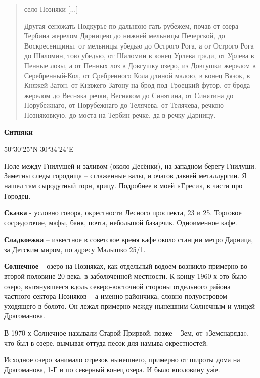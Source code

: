 \begin{quotation}
село Позняки [...]

Другая сеножать Подкурье по дальнюю гать рубежем, почав от озера Тербина жерелом Дарницею до нижней мельницы Печерской, до Воскресенщины, от мельницы убедью до Острого Рога, а от Острого Рога до Шаломин, тою убедью, от Шаломин в конец Урлева гради, от Урлева в Пенные лозы, а от Пенных лоз в Довгушку озеро, из Довгушки жерелом в Серебренный-Кол, от Сребренного Кола длиной малою, в конец Вязок, в Княжей Затон, от Княжего Затону на брод под Троецкий футор, от брода жерелом до Весняка речки, Весняком до Синятина, от Синятина до Порубежнаго, от Порубежнаго до Телячева, от Телячева, речкою Позняковкую, до моста на Тербин речке, да в речку Дарницу.
\end{quotation}

\medskip

\textbf{Ситняки} 

50°30'25"N   30°34'24"E

Поле между Гнилушей и заливом (около Десёнки), на западном берегу Гнилуши. Заметны следы городища – сглаженные валы, и очагов давней металлургии. Я нашел там сыродутный горн, крицу. Подробнее в моей «Ереси», в части про Городец.\\

\medskip

\textbf{Сказка} - условно говоря, окрестности Лесного проспекта, 23 и 25. Торговое сосредоточие, мафы, банк, почта, небольшой базарчик. Одноименное кафе.\\

\medskip

\textbf{Сладкоежка} – известное в советское время кафе около станции метро Дарница, за Детским миром, по адресу Малышко 25/1.\\

\medskip

\textbf{Солнечное} – озеро на Позняках, как отдельный водоем возникло примерно во второй половине 20 века, в заболоченной местности. К концу 1960-х это было озеро, вытянувшееся вдоль северо-восточной стороны отдельного района частного сектора Позняков – а именно райончика, словно полуостровом уходящего в болото. Он лежал примерно между нынешним Солнечным и улицей Драгоманова.

В 1970-х Солнечное называли Старой Прирвой, позже – Зем, от «Земснаряда», что был в озере, вымывая оттуда песок для намыва окрестностей.

Исходное озеро занимало отрезок нынешнего, примерно от широты дома на Драгоманова, 1-Г и по северный конец озера. И было вполовину у\'же.\\

